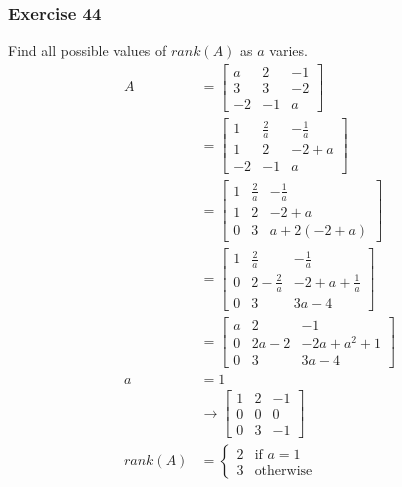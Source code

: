 \documentclass{math}
\begin{document}
\subsubsection*{Exercise 44}
Find all possible values of \( rank(A) \) as \( a \) varies.
\begin{align*}
  A &= \begin{bmatrix}
    a & 2 & -1 \\
    3 & 3 & -2 \\
    -2 & -1 & a
  \end{bmatrix} \\
  &= \begin{bmatrix}
    1 & \frac{2}{a} & -\frac{1}{a} \\
    1 & 2 & -2+a \\
    -2 & -1 & a
  \end{bmatrix} \\
  &= \begin{bmatrix}
    1 & \frac{2}{a} & -\frac{1}{a} \\
    1 & 2 & -2+a \\
    0 & 3 & a+2(-2+a)
  \end{bmatrix} \\
  &= \begin{bmatrix}
    1 & \frac{2}{a} & -\frac{1}{a} \\
    0 & 2-\frac{2}{a} & -2+a+\frac{1}{a} \\
    0 & 3 & 3a-4
  \end{bmatrix} \\
  &= \begin{bmatrix}
    a & 2 & -1 \\
    0 & 2a-2 & -2a+a^2+1 \\
    0 & 3 & 3a-4
  \end{bmatrix} \\
  a &= 1 \\
  &\to \begin{bmatrix}
    1 & 2 & -1 \\
    0 & 0 & 0 \\
    0 & 3 & -1
  \end{bmatrix} \\
  rank(A) &= \begin{cases}
    2 & \text{if } a = 1 \\
    3 & \text{otherwise}
  \end{cases}
\end{align*}
\end{document}
